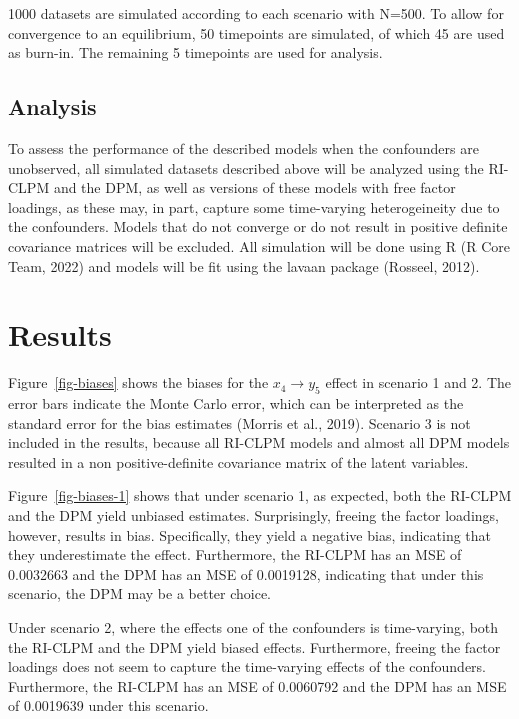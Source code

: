 \documentclass[
]{interact}
\begin{document}
1000 datasets are simulated according to each scenario with N=500. To
allow for convergence to an equilibrium, 50 timepoints are simulated, of
which 45 are used as burn-in. The remaining 5 timepoints are used for
analysis.

\hypertarget{analysis}{%
\subsection{Analysis}\label{analysis}}

To assess the performance of the described models when the confounders
are unobserved, all simulated datasets described above will be analyzed
using the RI-CLPM and the DPM, as well as versions of these models with
free factor loadings, as these may, in part, capture some time-varying
heterogeineity due to the confounders. Models that do not converge or do
not result in positive definite covariance matrices will be excluded.
All simulation will be done using R (R Core Team, 2022) and models will
be fit using the lavaan package (Rosseel, 2012).

\hypertarget{results}{%
\section{Results}\label{results}}

Figure~\ref{fig-biases} shows the biases for the \(x_4 \rightarrow y_5\)
effect in scenario 1 and 2. The error bars indicate the Monte Carlo
error, which can be interpreted as the standard error for the bias
estimates (Morris et al., 2019). Scenario 3 is not included in the
results, because all RI-CLPM models and almost all DPM models resulted
in a non positive-definite covariance matrix of the latent variables.

Figure~\ref{fig-biases-1} shows that under scenario 1, as expected, both
the RI-CLPM and the DPM yield unbiased estimates. Surprisingly, freeing
the factor loadings, however, results in bias. Specifically, they yield
a negative bias, indicating that they underestimate the effect.
Furthermore, the RI-CLPM has an MSE of 0.0032663 and the DPM has an MSE
of 0.0019128, indicating that under this scenario, the DPM may be a
better choice.

Under scenario 2, where the effects one of the confounders is
time-varying, both the RI-CLPM and the DPM yield biased effects.
Furthermore, freeing the factor loadings does not seem to capture the
time-varying effects of the confounders. Furthermore, the RI-CLPM has an
MSE of 0.0060792 and the DPM has an MSE of 0.0019639 under this
scenario.
\end{document}
